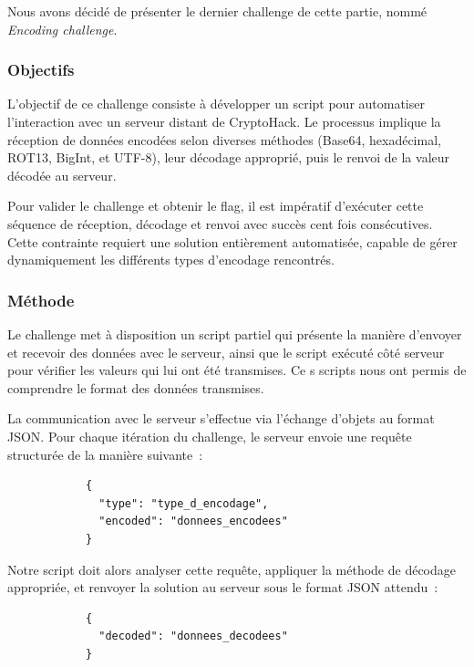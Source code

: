 \documentclass[12pt, a4paper]{article}
\begin{document}
        Nous avons décidé de présenter le dernier challenge de cette partie, nommé \textit{Encoding challenge}.
        
        \subsubsection{Objectifs}
            L'objectif de ce challenge consiste à développer un script pour automatiser l'interaction avec un serveur distant de CryptoHack. Le processus implique la réception de données encodées selon diverses méthodes (Base64, hexadécimal, ROT13, BigInt, et UTF-8), leur décodage approprié, puis le renvoi de la valeur décodée au serveur.
    
            Pour valider le challenge et obtenir le flag, il est impératif d'exécuter cette séquence de réception, décodage et renvoi avec succès cent fois consécutives. Cette contrainte requiert une solution entièrement automatisée, capable de gérer dynamiquement les différents types d'encodage rencontrés.
                
        \subsubsection{Méthode}
            Le challenge met à disposition un script partiel qui présente la manière d'envoyer et recevoir des données avec le serveur, ainsi que le script exécuté côté serveur pour vérifier les valeurs qui lui ont été transmises. Ce s scripts nous ont permis de comprendre le format des données transmises.

            La communication avec le serveur s'effectue via l'échange d'objets au format JSON. 
            Pour chaque itération du challenge, le serveur envoie une requête structurée de la 
            manière suivante~:
            
            \begin{verbatim}
            {
              "type": "type_d_encodage",
              "encoded": "donnees_encodees"
            }
            \end{verbatim}
            
            Notre script doit alors analyser cette requête, appliquer la méthode de décodage 
            appropriée, et renvoyer la solution au serveur sous le format JSON attendu~:
            
            \begin{verbatim}
            {
              "decoded": "donnees_decodees"
            }
            \end{verbatim}
\end{document}
